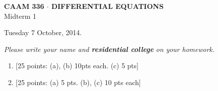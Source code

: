 \documentclass[10pt]{article}
\begin{document}
\vspace*{-5em}
\begin{center}
\large \textsf{\textbf{CAAM 336 $\cdot$ DIFFERENTIAL EQUATIONS}\\[0.5em]
Midterm 1 }
\end{center}

Tuesday 7 October, 2014.
\begin{center}
\emph{Please write your name and \textbf{residential college} on your homework.}
\end{center}

\begin{enumerate}
\item {[25 points: (a), (b) 10pts each.  (c) 5 pts]}\\  
\newpage
\item {[25 points: (a) 5 pts. (b), (c) 10 pts each]}\\  


\end{enumerate}
\end{document}
